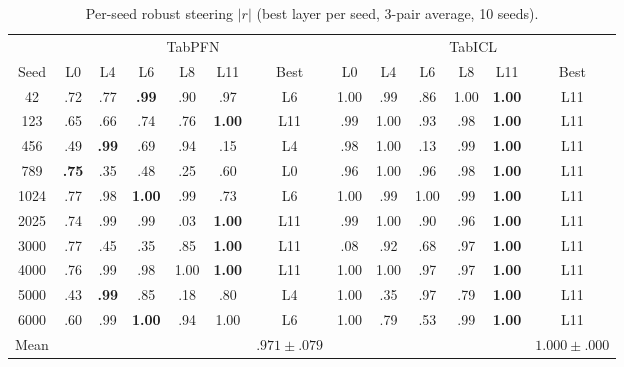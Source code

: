 \documentclass{article}
\begin{document}
\begin{table}[htbp]
\centering
\caption{Per-seed robust steering $|r|$ (best layer per seed, 3-pair average, 10 seeds).}
\label{tab:perseed-steering}
\scriptsize
\begin{tabular}{@{}c ccccc c ccccc c@{}}
\toprule
 & \multicolumn{6}{c}{TabPFN} & \multicolumn{6}{c}{TabICL} \\
\cmidrule(lr){2-7} \cmidrule(lr){8-13}
Seed & L0 & L4 & L6 & L8 & L11 & Best & L0 & L4 & L6 & L8 & L11 & Best \\
\midrule
42 & .72 & .77 & \textbf{.99} & .90 & .97 & L6 & 1.00 & .99 & .86 & 1.00 & \textbf{1.00} & L11 \\
123 & .65 & .66 & .74 & .76 & \textbf{1.00} & L11 & .99 & 1.00 & .93 & .98 & \textbf{1.00} & L11 \\
456 & .49 & \textbf{.99} & .69 & .94 & .15 & L4 & .98 & 1.00 & .13 & .99 & \textbf{1.00} & L11 \\
789 & \textbf{.75} & .35 & .48 & .25 & .60 & L0 & .96 & 1.00 & .96 & .98 & \textbf{1.00} & L11 \\
1024 & .77 & .98 & \textbf{1.00} & .99 & .73 & L6 & 1.00 & .99 & 1.00 & .99 & \textbf{1.00} & L11 \\
2025 & .74 & .99 & .99 & .03 & \textbf{1.00} & L11 & .99 & 1.00 & .90 & .96 & \textbf{1.00} & L11 \\
3000 & .77 & .45 & .35 & .85 & \textbf{1.00} & L11 & .08 & .92 & .68 & .97 & \textbf{1.00} & L11 \\
4000 & .76 & .99 & .98 & 1.00 & \textbf{1.00} & L11 & 1.00 & 1.00 & .97 & .97 & \textbf{1.00} & L11 \\
5000 & .43 & \textbf{.99} & .85 & .18 & .80 & L4 & 1.00 & .35 & .97 & .79 & \textbf{1.00} & L11 \\
6000 & .60 & .99 & \textbf{1.00} & .94 & 1.00 & L6 & 1.00 & .79 & .53 & .99 & \textbf{1.00} & L11 \\
\midrule
Mean & & & & & & $.971{\pm}.079$ & & & & & & $1.000{\pm}.000$ \\
\bottomrule
\end{tabular}
\end{table}
\end{document}

